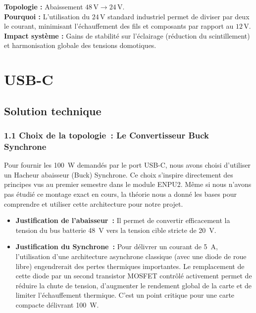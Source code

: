 \begin{decisionbox}
\textbf{Topologie :} Abaissement $48 \, \text{V} \to 24 \, \text{V}$. \\
\textbf{Pourquoi :} L'utilisation du $24 \, \text{V}$ standard industriel permet de diviser par deux le courant, minimisant l'échauffement des fils et composants par rapport au $12 \, \text{V}$. \\
\textbf{Impact système :} Gains de stabilité sur l'éclairage (réduction du scintillement) et harmonisation globale des tensions domotiques.
\end{decisionbox}

    \section{USB-C}
        \subsection{Solution technique}

\subsubsection*{1.1 Choix de la topologie~: Le Convertisseur Buck Synchrone}

Pour fournir les 100~W demandés par le port USB-C, nous avons choisi d'utiliser un Hacheur abaisseur (Buck) Synchrone. Ce choix s'inspire directement des principes vus au premier semestre dans le module ENPU2. Même si nous n'avons pas étudié ce montage exact en cours, la théorie nous a donné les bases pour comprendre et utiliser cette architecture pour notre projet.

\begin{itemize}
    \item \textbf{Justification de l'abaisseur~:} Il permet de convertir efficacement la tension du bus batterie 48~V vers la tension cible stricte de 20~V.
    \item \textbf{Justification du Synchrone~:} Pour délivrer un courant de 5~A, l'utilisation d'une architecture asynchrone classique (avec une diode de roue libre) engendrerait des pertes thermiques importantes. Le remplacement de cette diode par un second transistor MOSFET contrôlé activement permet de réduire la chute de tension, d'augmenter le rendement global de la carte et de limiter l'échauffement thermique. C'est un point critique pour une carte compacte délivrant 100~W.
\end{itemize}

